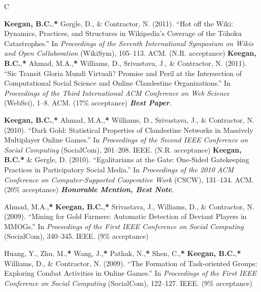 \documentclass{cv}
\begin{document}
\begin{entries}{C}
		\item \textbf{Keegan, B.C.},\textbf{*} Gergle, D., \& Contractor, N. (2011). ``Hot off the Wiki: Dynamics, Practices, and Structures in Wikipedia's Coverage of the T\={o}hoku Catastrophes.'' In \textit{Proceedings of the Seventh International Symposium on Wikis and Open Collaboration} (WikiSym), 105--113. ACM.  (N.R. acceptance)
		\awarditem \textbf{Keegan, B.C.},\textbf{*} Ahmad, M.A.,\textbf{*} Williams, D., Srivastava, J., \& Contractor, N. (2011). ``Sic Transit Gloria Mundi Virtuali? Promise and Peril at the Intersection of Computational Social Science and Online Clandestine Organizations.'' In \textit{Proceedings of the Third International ACM Conference on Web Science} (WebSci), 1--8. ACM.  (17\% acceptance) \textbf{\textit{Best Paper}}.
		\item \textbf{Keegan, B.C.},\textbf{*} Ahmad, M.A.,\textbf{*} Williams, D., Srivastava, J., \& Contractor, N. (2010). ``Dark Gold: Statistical Properties of Clandestine Networks in Massively Multiplayer Online Games.'' In \textit{Proceedings of the Second IEEE Conference on Social Computing} (SocialCom), 201--208. IEEE.  (N.R. acceptance)
		\awarditem \textbf{Keegan, B.C.}\textbf{*} \& Gergle, D. (2010). ``Egalitarians at the Gate: One-Sided Gatekeeping Practices in Participatory Social Media.'' In \textit{Proceedings of the 2010 ACM Conference on Computer-Supported Cooperative Work} (CSCW), 131--134. ACM.  (20\% acceptance) \textbf{\textit{Honorable Mention, Best Note}}.
		\item Ahmad, M.A.,\textbf{*} \textbf{Keegan, B.C.},\textbf{*} Srivastava, J., Williams, D., \& Contractor, N. (2009). ``Mining for Gold Farmers: Automatic Detection of Deviant Players in MMOGs.'' In \textit{Proceedings of the First IEEE Conference on Social Computing} (SocialCom), 340--345. IEEE.  (9\% acceptance)
		\item Huang, Y., Zhu, M.,\textbf{*} Wang, J.,\textbf{*} Pathak, N.,\textbf{*} Shen, C.,\textbf{*} \textbf{Keegan, B.C.},\textbf{*} Williams, D., \& Contractor, N. (2009). ``The Formation of Task-oriented Groups: Exploring Combat Activities in Online Games.'' In \textit{Proceedings of the First IEEE Conference on Social Computing} (SocialCom), 122--127. IEEE.  (9\% acceptance)
	\end{entries}
\end{document}
